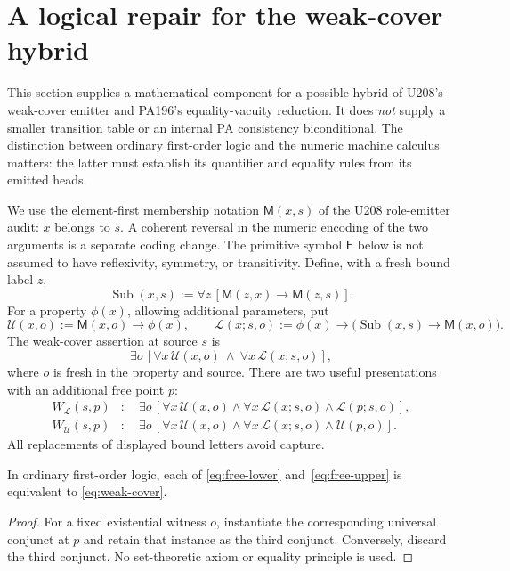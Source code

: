 \section{A logical repair for the weak-cover hybrid}\label{sec:pointed-repair}
\begingroup
\newcommand{\Sub}{\operatorname{Sub}}
\newcommand{\Eq}{\mathsf E}
\newcommand{\Mem}{\mathsf M}
\newcommand{\Low}{\mathcal L}
\newcommand{\Upp}{\mathcal U}

This section supplies a mathematical component for a possible hybrid of
U208's weak-cover emitter and PA196's equality-vacuity reduction. It does
\emph{not} supply a smaller transition table or an internal PA
consistency biconditional. The distinction between ordinary first-order
logic and the numeric machine calculus matters: the latter must establish
its quantifier and equality rules from its emitted heads.

We use the element-first membership notation $\Mem(x,s)$ of the U208
role-emitter audit: $x$ belongs to $s$. A coherent reversal in the numeric
encoding of the two arguments is a separate coding change. The primitive
symbol $\Eq$ below is not assumed to have reflexivity, symmetry, or
transitivity. Define, with a fresh bound label $z$,
\[
 \Sub(x,s):=\forall z\,[\Mem(z,x)\to\Mem(z,s)].
\]
For a property $\phi(x)$, allowing additional parameters, put
\[
 \Upp(x,o):=\Mem(x,o)\to\phi(x),\qquad
 \Low(x;s,o):=\phi(x)\to\bigl(\Sub(x,s)\to\Mem(x,o)\bigr).
\]
The weak-cover assertion at source $s$ is
\begin{equation}\label{eq:weak-cover}
 \exists o\,[\forall x\,\Upp(x,o)\ \wedge\
                 \forall x\,\Low(x;s,o)],
\end{equation}
where $o$ is fresh in the property and source. There are two useful
presentations with an additional free point $p$:
\begin{align}
 W_{\Low}(s,p)&:\quad
 \exists o\,[\forall x\,\Upp(x,o)\wedge
                  \forall x\,\Low(x;s,o)\wedge\Low(p;s,o)],
                  \label{eq:free-lower}\\
 W_{\Upp}(s,p)&:\quad
 \exists o\,[\forall x\,\Upp(x,o)\wedge
                  \forall x\,\Low(x;s,o)\wedge\Upp(p,o)].
                  \label{eq:free-upper}
\end{align}
All replacements of displayed bound letters avoid capture.

\begin{proposition}\label{prop:free-instance}
In ordinary first-order logic, each of
\eqref{eq:free-lower} and~\eqref{eq:free-upper} is equivalent to
\eqref{eq:weak-cover}.
\end{proposition}
\begin{proof}
For a fixed existential witness $o$, instantiate the corresponding
universal conjunct at $p$ and retain that instance as the third conjunct.
Conversely, discard the third conjunct. No set-theoretic axiom or equality
principle is used.
\end{proof}

